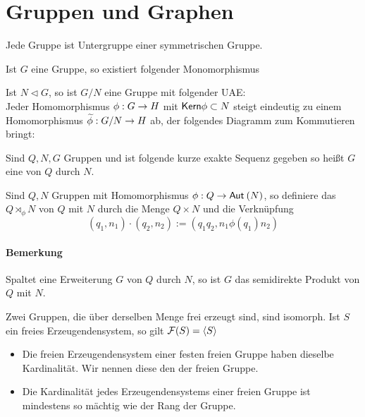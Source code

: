 \documentclass{article}
\newcommand{\normal}{\vartriangleleft}
\newcommand{\tm}{\subset}
\begin{document}
\tableofcontents

\newpage
\section{Gruppen und Graphen}
Jede Gruppe ist Untergruppe einer symmetrischen Gruppe.
\begin{Beweis}{}
Ist $G$ eine Gruppe, so existiert folgender Monomorphismus
\end{Beweis}
Ist $N\normal G $, so ist $G/N$ eine Gruppe mit folgender UAE:\\
Jeder Homomorphismus $\phi : G \overset{}{\rightarrow} H$ mit $\Ker \phi \tm N $ steigt eindeutig zu einem Homomorphismus $\widetilde{\phi} : G/N \overset{}{\rightarrow} H$ ab, der folgendes Diagramm zum Kommutieren bringt:
\begin{center}
\end{center}

Sind $Q,N,G$ Gruppen und ist folgende kurze exakte Sequenz gegeben
so heißt $G$ eine  von $Q$ durch $N$.

Sind $Q,N$ Gruppen mit Homomorphismus $\phi : Q \overset{}{\rightarrow} \textsf{Aut}_{}\left(N\right)$, so definiere das  $Q\rtimes_\phi N$ von $Q$ mit $N$ durch die Menge $Q\times N$ und die Verknüpfung
\[ (q_1,n_1) \cdot (q_2, n_2) := (q_1q_2, n_1 \phi(q_1) n_2 ) \]
\paragraph{Bemerkung}
Spaltet eine Erweiterung $G$ von $Q$ durch $N$, so ist $G$ das semidirekte Produkt von $Q$ mit $N$.


Zwei Gruppen, die über derselben Menge frei erzeugt sind, sind isomorph.
\Kor{}
Ist $S$ ein freies Erzeugendensystem, so gilt
$\F(S) = \grp{S}{}$

\begin{itemize}
\item Die freien Erzeugendensystem einer festen freien Gruppe haben dieselbe Kardinalität. Wir nennen diese den  der freien Gruppe.
\item Die Kardinalität jedes Erzeugendensystems einer freien Gruppe ist mindestens so mächtig wie der Rang der Gruppe. 
\end{itemize}
\end{document}
